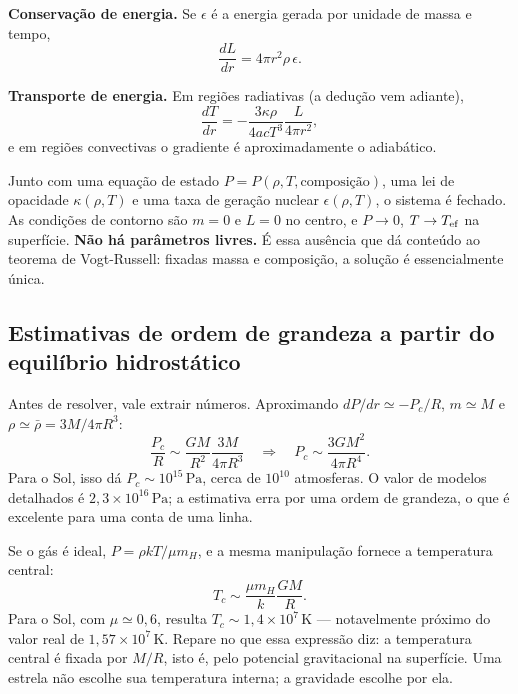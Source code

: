 \documentclass[11pt,a4paper]{article}
\begin{document}
\textbf{Conservação de energia.} Se $\epsilon$ é a energia gerada por unidade de massa e tempo,
\[
\frac{dL}{dr}=4\pi r^{2}\rho\,\epsilon.
\]

\textbf{Transporte de energia.} Em regiões radiativas (a dedução vem adiante),
\[
\frac{dT}{dr}=-\frac{3\kappa\rho}{4ac T^{3}}\frac{L}{4\pi r^{2}},
\]
e em regiões convectivas o gradiente é aproximadamente o adiabático.

Junto com uma equação de estado $P=P(\rho,T,\text{composição})$, uma lei de opacidade $\kappa(\rho,T)$ e uma taxa de geração nuclear $\epsilon(\rho,T)$, o sistema é fechado. As condições de contorno são $m=0$ e $L=0$ no centro, e $P\to0$, $T\to T_{\rm ef}$ na superfície. \textbf{Não há parâmetros livres.} É essa ausência que dá conteúdo ao teorema de Vogt-Russell: fixadas massa e composição, a solução é essencialmente única.

\subsection*{Estimativas de ordem de grandeza a partir do equilíbrio hidrostático}

Antes de resolver, vale extrair números. Aproximando $dP/dr\simeq-P_c/R$, $m\simeq M$ e $\rho\simeq\bar{\rho}=3M/4\pi R^{3}$:
\[
\frac{P_c}{R}\sim\frac{GM}{R^{2}}\frac{3M}{4\pi R^{3}}
\quad\Longrightarrow\quad
P_c\sim\frac{3GM^{2}}{4\pi R^{4}}.
\]
Para o Sol, isso dá $P_c\sim10^{15}\,\mathrm{Pa}$, cerca de $10^{10}$ atmosferas. O valor de modelos detalhados é $2{,}3\times10^{16}\,\mathrm{Pa}$; a estimativa erra por uma ordem de grandeza, o que é excelente para uma conta de uma linha.

Se o gás é ideal, $P=\rho kT/\mu m_H$, e a mesma manipulação fornece a temperatura central:
\[
T_c\sim\frac{\mu m_H}{k}\frac{GM}{R}.
\]
Para o Sol, com $\mu\simeq0{,}6$, resulta $T_c\sim1{,}4\times10^{7}\,\mathrm{K}$ --- notavelmente próximo do valor real de $1{,}57\times10^{7}\,\mathrm{K}$. Repare no que essa expressão diz: a temperatura central é fixada por $M/R$, isto é, pelo potencial gravitacional na superfície. Uma estrela não escolhe sua temperatura interna; a gravidade escolhe por ela.
\end{document}
